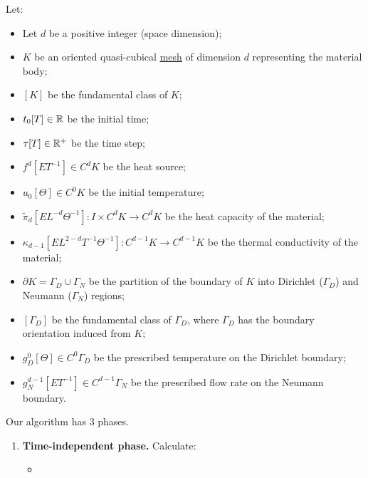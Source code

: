 \begin{algorithm}
  \label{idec/diffusion/discrete/transient/mixed_weak_solve_trapezoidal-algorithm}
  Let:
  \begin{itemize}
    \item
      Let $d$ be a positive integer (space dimension);
    \item
      $K$ be an oriented quasi-cubical \hyperref[idec:mesh:definition]{mesh} of
      dimension $d$ representing the material body;
    \item
      $[K]$ be the fundamental class of $K$;
    \item
      $t_0 [T] \in \mathbb{R}$ be the initial time;
    \item
      $\tau [T] \in \mathbb{R}^+$ be the time step;
    \item
      $f^d [E T^{-1}] \in C^d K$ be the heat source;
    \item
      $u_0 [\Theta] \in C^0 K$ be the initial temperature;
    \item
      $\tilde{\pi}_d [E L^{-d} \Theta^{-1}] \colon I \times C^d K \to C^d K$
      be the heat capacity of the material;
    \item
      $\kappa_{d - 1} [E L^{2 - d} T^{-1} \Theta^{-1}]
        \colon C^{d - 1} K \to C^{d - 1} K$
      be the thermal conductivity of the material;
    \item
      $\partial K = \Gamma_D \cup \Gamma_N$ be the partition of the boundary of
      $K$ into Dirichlet ($\Gamma_D$) and Neumann ($\Gamma_N$) regions;
    \item
      $[\Gamma_D]$ be the fundamental class of $\Gamma_D$, where $\Gamma_D$
      has the boundary orientation induced from $K$;
    \item
      $g_D^0 [\Theta] \in C^0 \Gamma_D$
      be the prescribed temperature on the Dirichlet boundary;
    \item
      $g_N^{d - 1} [E T^{-1}] \in C^{d - 1} \Gamma_N$
      be the prescribed flow rate on the Neumann boundary.
  \end{itemize}
  Our algorithm has $3$ phases.
  \begin{enumerate}
    \item
      \textbf{Time-independent phase.}
      Calculate:
      \begin{itemize}
        \item

\end{itemize}
\end{enumerate}
\end{algorithm}
